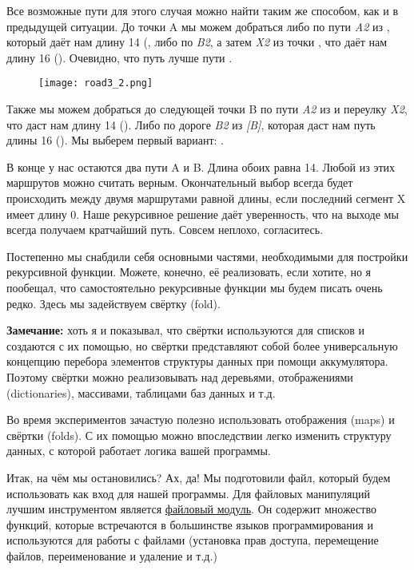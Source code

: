 Все возможные пути для этого случая можно найти таким же способом, как и в предыдущей ситуации.
До точки A мы можем добраться либо по пути \emph{A2} из \ops{[B, X]}, который даёт нам длину 14 (, либо по \emph{B2}, а затем \emph{X2} из точки \ops{[B]}, что даёт нам длину 16 ().
Очевидно, что путь \ops{[B, X, A]} лучше пути \ops{[B, B, X]}.
\begin{figure}[h!]
    \texttt{[image: road3\_2.png]}
\end{figure}

Также мы можем добраться до следующей точки B по пути \emph{A2} из \ops{[B, X]} и переулку \emph{X2}, что даст нам длину 14 ().
Либо по дороге \emph{B2} из \emph{[B]}, которая даст нам путь длины 16 ().
Мы выберем первый вариант: \ops{[B, X, A, X]}.

В конце у нас остаются два пути A и B.
Длина обоих равна 14.
Любой из этих маршрутов можно считать верным.
Окончательный  выбор всегда будет происходить между двумя маршрутами равной длины, если последний сегмент X имеет длину 0.
Наше рекурсивное решение даёт уверенность, что на выходе мы всегда получаем кратчайший путь.
Совсем неплохо, согласитесь.

Постепенно мы снабдили себя основными частями, необходимыми для постройки рекурсивной функции.
Можете, конечно, её реализовать, если хотите, но я пообещал, что самостоятельно рекурсивные функции мы будем писать очень редко.
Здесь мы задействуем свёртку (fold).\\
\colorbox{lgray}
{
\begin{minipage}{1.0\linewidth}
    \textbf{Замечание:} хоть я и показывал, что свёртки используются для списков и создаются с их помощью, но свёртки представляют собой более универсальную концепцию перебора элементов структуры данных при помощи аккумулятора.
Поэтому свёртки можно реализовывать над деревьями, отображениями (dictionaries), массивами, таблицами баз данных и т.д.

Во время экспериментов зачастую полезно использовать отображения (maps) и свёртки (folds).
С их помощью можно впоследствии легко изменить структуру данных, с которой работает логика вашей программы.
\end{minipage}
}

Итак, на чём мы остановились?
Ах, да!
Мы подготовили файл, который будем использовать как вход для нашей программы.
Для файловых манипуляций лучшим инструментом является \href{http://erldocs.com/R15B/kernel/file.html}{файловый модуль}.
Он содержит множество функций, которые встречаются в большинстве языков программирования и используются для работы с файлами (установка прав доступа, перемещение файлов, переименование и удаление и т.д.)

